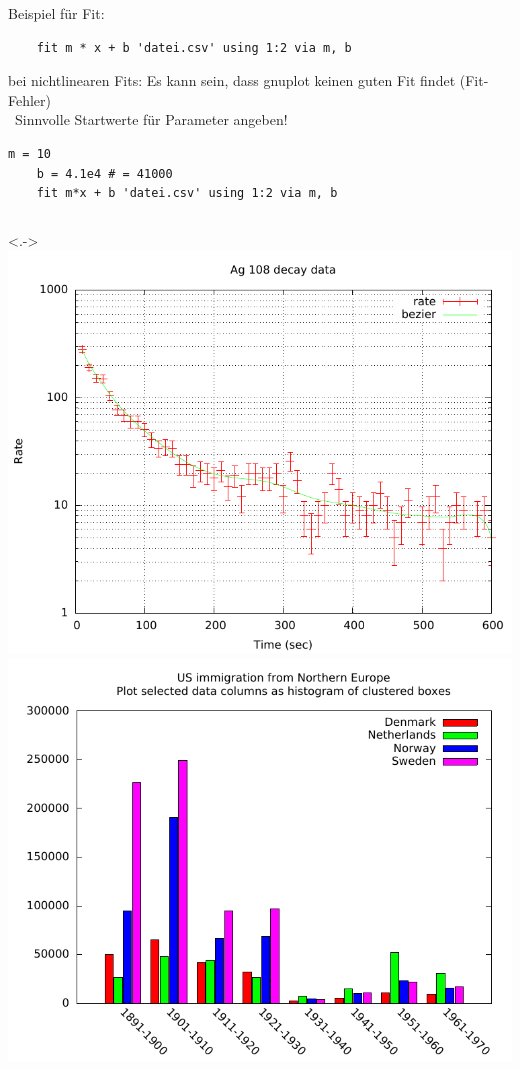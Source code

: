 \begin{frame}[<+->][fragile]

	Beispiel für Fit:
	\begin{lstlisting}
	fit m * x + b 'datei.csv' using 1:2 via m, b
	\end{lstlisting}
	
	 bei nichtlinearen Fits: Es kann sein, dass gnuplot keinen guten Fit findet (Fit-Fehler)\\
	\textrightarrow~Sinnvolle Startwerte für Parameter angeben!
	\begin{lstlisting}[gobble=4]
	m = 10
	b = 4.1e4 # = 41000
	fit m*x + b 'datei.csv' using 1:2 via m, b
	\end{lstlisting}

	\centering
	\begin{columns}<.->
		\includegraphics[width=\textwidth]{res/gnuplot_silver.pdf}
		\hspace*{-0.02\textwidth}
		\includegraphics[width=\textwidth]{res/gnuplot_histogram.pdf}

\end{columns}
\end{frame}
